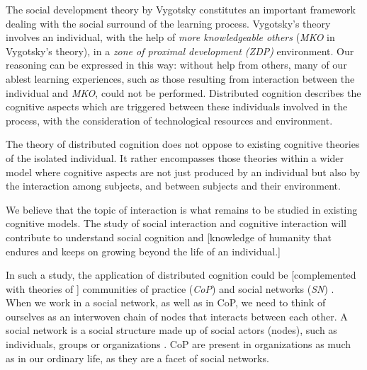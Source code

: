 \documentclass[10pt,twocolumn,ieeetran]{article}
\newcommand{\nota}[1]{{\color{red}[#1]}}
\begin{document}
The social development theory by Vygotsky \cite{Wertsch} constitutes an important framework 
dealing with the social surround of the learning process. Vygotsky's theory involves an individual, with the help of {\it more knowledgeable others} ({\it MKO} in Vygotsky's theory), in a {\it zone of proximal development (ZDP)} environment. Our reasoning can be expressed in this way: without help from others, many of our ablest learning experiences, such as those resulting from interaction between the individual and {\it MKO},  could not be performed. Distributed cognition describes the cognitive aspects which are triggered between these individuals involved in the process, with the consideration of technological resources and environment.

The theory of distributed cognition \cite{Salomon} does not oppose to existing cognitive theories of the isolated individual. It rather encompasses those theories within a wider model where cognitive aspects are not just produced by an individual but also by the interaction among subjects, and between subjects and their environment.

We believe that the topic of interaction is what remains to be studied in existing cognitive models. The study of social interaction and cognitive interaction will contribute to understand social cognition and \nota{knowledge of humanity \cite{Denny} that endures and keeps on growing beyond the life of an individual.}

In such a study, the application of distributed cognition could be \nota{complemented with theories of } communities of practice ({\it CoP}) \cite{Wenger} and social networks ({\it SN}) \cite{Kadushin}\cite{Santos}\cite{Watts}. When we work in a social network, as well as in CoP, we need to think of ourselves as an interwoven chain of nodes that interacts between each other. A social network is a social structure made up of social actors (nodes), such as individuals, groups or organizations \cite{Wasserman}\cite{Jamali}. CoP are present in organizations as much as in our ordinary life, as they are a facet of social networks.
\end{document}
